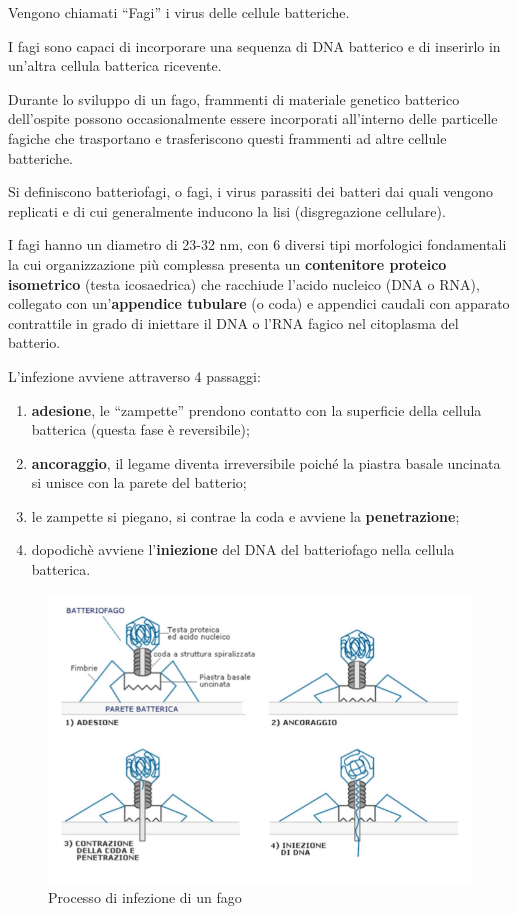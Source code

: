 \documentclass[11pt]{book}
\begin{document}
Vengono chiamati ``Fagi'' i virus delle cellule batteriche.

I fagi sono capaci di incorporare una sequenza di DNA batterico e di inserirlo in un'altra cellula batterica ricevente.

\vspace{1em}
Durante lo sviluppo di un fago, frammenti di materiale genetico batterico dell’ospite possono occasionalmente essere incorporati all’interno delle particelle fagiche che trasportano e trasferiscono questi frammenti ad altre cellule batteriche.

Si definiscono batteriofagi, o fagi, i virus parassiti dei batteri dai quali vengono replicati e di cui generalmente inducono la lisi (disgregazione cellulare).

I fagi hanno un diametro di 23-32 nm, con 6 diversi tipi morfologici fondamentali la cui organizzazione più complessa presenta un \textbf{contenitore proteico isometrico} (testa icosaedrica) che racchiude l’acido nucleico (DNA o RNA), collegato con un’\textbf{appendice tubulare} (o coda) e appendici caudali con apparato contrattile in grado di iniettare il DNA o l’RNA fagico nel citoplasma del batterio.

L'infezione avviene attraverso 4 passaggi:
\begin{enumerate}
\item \textbf{adesione}, le ``zampette'' prendono contatto con la superficie della cellula batterica (questa fase è reversibile);
\item \textbf{ancoraggio}, il legame diventa irreversibile poiché la piastra basale uncinata si unisce con la parete del batterio;
\item le zampette si piegano, si contrae la coda e avviene la \textbf{penetrazione};
\item dopodichè avviene l’\textbf{iniezione} del DNA del batteriofago nella cellula batterica.
\end{enumerate}

\begin{figure}[htp]
\centering
\includegraphics[scale=0.4]{img/Trasduzione.png}
\caption{Processo di infezione di un fago}
\label{}
\end{figure}
\end{document}

